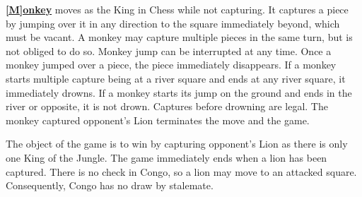 \vspace{0.5em}

\underline{\textbf{[M]onkey}} moves as the King in Chess while not capturing.
It captures a piece by jumping over it in any direction to the square
immediately beyond, which must be vacant. A monkey may capture multiple pieces
in the same turn, but is not obliged to do so. Monkey jump can be interrupted
at any time. Once a monkey jumped over a piece, the piece immediately
disappears. If a monkey starts multiple capture being at a river square and
ends at any river square, it immediately drowns. If a monkey starts its jump
on the ground and ends in the river or opposite, it is not drown. Captures
before drowning are legal. The monkey captured opponent's Lion terminates the
move and the game.

\vspace{0.5em}

The object of the game is to win by capturing opponent's Lion as there is only
one King of the Jungle. The game immediately ends when a lion has been
captured. There is no check in Congo, so a lion may move to an attacked
square. Consequently, Congo has no draw by stalemate.
